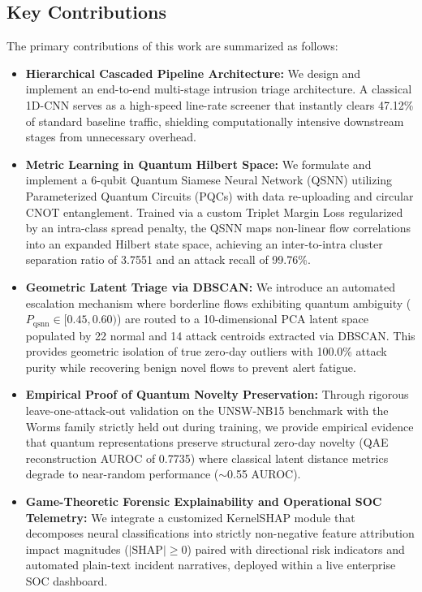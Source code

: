 \documentclass[preprint,12pt]{elsarticle}
\begin{document}
\subsection{Key Contributions}
The primary contributions of this work are summarized as follows:
\begin{itemize}
    \item \textbf{Hierarchical Cascaded Pipeline Architecture:} We design and implement an end-to-end multi-stage intrusion triage architecture. A classical 1D-CNN serves as a high-speed line-rate screener that instantly clears 47.12\% of standard baseline traffic, shielding computationally intensive downstream stages from unnecessary overhead.
    \item \textbf{Metric Learning in Quantum Hilbert Space:} We formulate and implement a 6-qubit Quantum Siamese Neural Network (QSNN) utilizing Parameterized Quantum Circuits (PQCs) with data re-uploading and circular CNOT entanglement. Trained via a custom Triplet Margin Loss regularized by an intra-class spread penalty, the QSNN maps non-linear flow correlations into an expanded Hilbert state space, achieving an inter-to-intra cluster separation ratio of 3.7551 and an attack recall of 99.76\%.
    \item \textbf{Geometric Latent Triage via DBSCAN:} We introduce an automated escalation mechanism where borderline flows exhibiting quantum ambiguity ($P_{\text{qsnn}} \in [0.45, 0.60)$) are routed to a 10-dimensional PCA latent space populated by 22 normal and 14 attack centroids extracted via DBSCAN. This provides geometric isolation of true zero-day outliers with 100.0\% attack purity while recovering benign novel flows to prevent alert fatigue.
    \item \textbf{Empirical Proof of Quantum Novelty Preservation:} Through rigorous leave-one-attack-out validation on the UNSW-NB15 benchmark with the Worms family strictly held out during training, we provide empirical evidence that quantum representations preserve structural zero-day novelty (QAE reconstruction AUROC of 0.7735) where classical latent distance metrics degrade to near-random performance ($\sim$0.55 AUROC).
    \item \textbf{Game-Theoretic Forensic Explainability and Operational SOC Telemetry:} We integrate a customized KernelSHAP module that decomposes neural classifications into strictly non-negative feature attribution impact magnitudes ($|\text{SHAP}| \ge 0$) paired with directional risk indicators and automated plain-text incident narratives, deployed within a live enterprise SOC dashboard.
\end{itemize}
\end{document}
